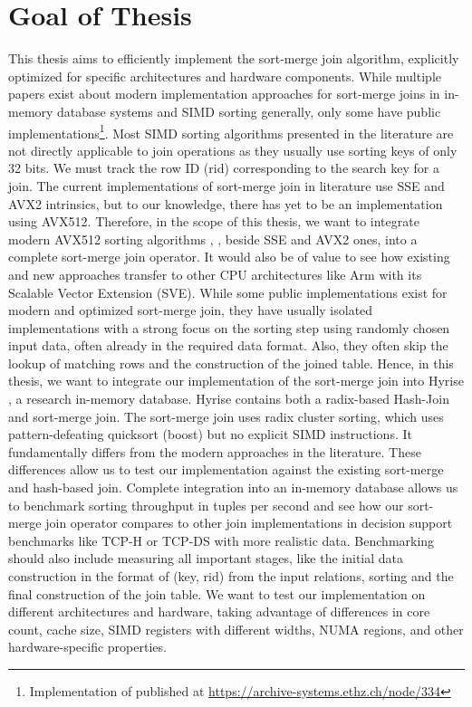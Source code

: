 \section{Goal of Thesis}
\label{sec:goal}


This thesis aims to efficiently implement the sort-merge join algorithm,
explicitly optimized for specific architectures and hardware components. While multiple papers
exist about modern implementation approaches for sort-merge joins in in-memory database systems
and SIMD sorting generally, only some have public 
implementations\footnote{Implementation of \cite{Balkesen} published at \url{https://archive-systems.ethz.ch/node/334}}.
Most SIMD sorting algorithms
presented in the literature are not directly applicable to join operations as they usually use
sorting keys of only 32 bits. We must track the row ID (rid) corresponding to the search key for
a join. The current implementations of sort-merge join in literature use SSE and AVX2 intrinsics,
but to our knowledge, there has yet to be an implementation using AVX512. Therefore, in the scope
of this thesis, we want to integrate modern AVX512 sorting algorithms \cite{Watkins}, \cite{8855628},
beside SSE and AVX2 ones, into a complete sort-merge
join operator. It would also be of value to see how existing and new approaches transfer to other
CPU architectures like Arm with its Scalable Vector Extension (SVE). While some public implementations
exist for modern and optimized sort-merge join, they have usually isolated implementations with a strong
focus on the sorting step using randomly chosen input data, often already in the required data format. 
Also, they often skip the lookup of matching rows and the construction of the joined table.
Hence, in this thesis, we want to integrate our implementation of the sort-merge join into Hyrise
\cite{DBLP:conf/edbt/DreselerK0KUP19},
a research in-memory database. Hyrise contains both a radix-based Hash-Join and sort-merge join.
The sort-merge join uses radix cluster sorting, which uses pattern-defeating quicksort (boost)
but no explicit SIMD instructions. It fundamentally differs from the modern approaches in the literature.
These differences allow us to test our implementation against the existing sort-merge and hash-based join.
Complete integration into an in-memory database allows us to benchmark sorting throughput in
tuples per second and see how our sort-merge join operator compares to other join implementations
in decision support benchmarks like TCP-H or TCP-DS with more realistic data. Benchmarking should
also include measuring all important stages, like the initial data construction in
the format of (key, rid) from the input relations, sorting and the final construction of the join table.
We want to test our implementation on different architectures and hardware, taking advantage of
differences in core count, cache size, SIMD registers with different widths, NUMA regions, 
and other hardware-specific properties.
